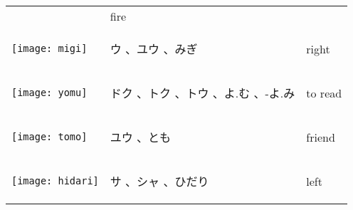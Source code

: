 \documentclass[a4paper,12pt]{extarticle}
\begin{document}
\begin{longtable}{|lp{6cm}p{4cm}|}
	                                   &
	fire
	\\
	\begin{minipage}{0.3\textwidth}
		\centerline{
			\texttt{[image: migi]}
		}
	\end{minipage}
	                                   &
	\begin{CJK}{UTF8}{min} ウ 、ユウ 、みぎ\end{CJK}
	                                   &
	right
	\\
	\begin{minipage}{0.3\textwidth}
		\centerline{
			\texttt{[image: yomu]}
		}
	\end{minipage}
	                                   &
	\begin{CJK}{UTF8}{min} ドク 、トク 、トウ 、よ.む 、-よ.み\end{CJK}
	                                   &
	to read
	\\
	\begin{minipage}{0.3\textwidth}
		\centerline{
			\texttt{[image: tomo]}
		}
	\end{minipage}
	                                   &
	\begin{CJK}{UTF8}{min} ユウ 、とも\end{CJK}
	                                   &
	friend
	\\
	\begin{minipage}{0.3\textwidth}
		\centerline{
			\texttt{[image: hidari]}
		}
	\end{minipage}
	                                   &
	\begin{CJK}{UTF8}{min} サ 、シャ 、ひだり\end{CJK}
	                                   &
	left
	\\

\end{longtable}
\end{document}
